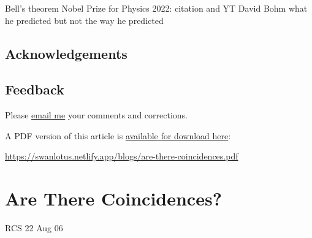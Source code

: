 \documentclass[
  a4paper,
]{article}
\begin{document}
Bell's theorem Nobel Prize for Physics 2022: citation and YT David Bohm
what he predicted but not the way he predicted

\subsection{Acknowledgements}\label{acknowledgements}

\subsection{Feedback}\label{feedback}

Please \href{mailto:feedback.swanlotus@gmail.com}{email me} your
comments and corrections.

\noindent A PDF version of this article is
\href{./are-there-coincidences.pdf}{available for download here}:

\begin{sffamily}

\url{https://swanlotus.netlify.app/blogs/are-there-coincidences.pdf}

\end{sffamily}

\section{Are There Coincidences?}\label{are-there-coincidences}

RCS 22 Aug 06
\end{document}
